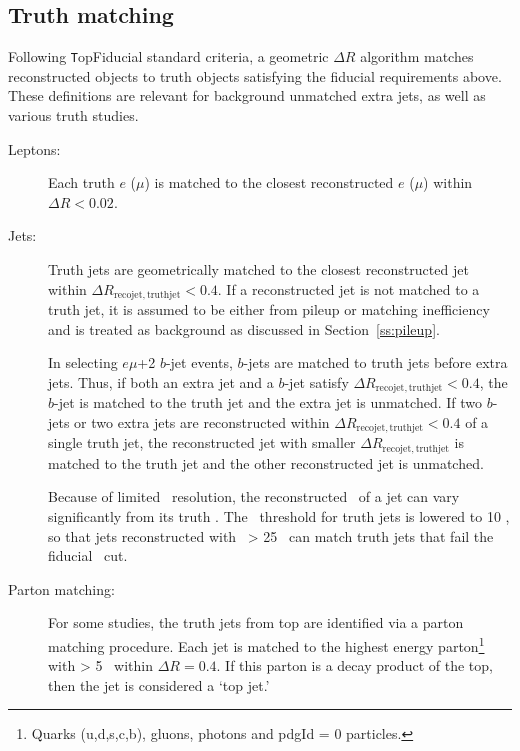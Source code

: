 \subsection{Truth matching}
\label{ss:tmatching}
Following {\texttt TopFiducial} standard criteria, a geometric $\Delta R$ algorithm matches reconstructed objects to truth objects satisfying the fiducial requirements above. These definitions are relevant for background unmatched extra jets, as well as various truth studies.
\begin{description}
\item[Leptons:] Each truth $e$ ($\mu$) is matched to the closest reconstructed $e$ ($\mu$) within $\Delta R < 0.02$.
\item[Jets:] Truth jets are geometrically matched to the closest reconstructed jet within $\Delta R_{\mathrm{reco jet, truth jet}} < 0.4$. If a reconstructed jet is not matched to a truth jet, it is assumed to be either from pileup or matching inefficiency and is treated as background as discussed in Section~\ref{ss:pileup}.

In selecting $e\mu$+2 $b$-jet events, $b$-jets are matched to truth jets before extra jets. Thus, if both an extra jet and a $b$-jet satisfy $\Delta R_{\mathrm{reco jet, truth jet}}<0.4$, the $b$-jet is matched to the truth jet and the extra jet is unmatched. If two $b$-jets or two extra jets are reconstructed within $\Delta R_{\mathrm{reco jet, truth jet}}<0.4$ of a single truth jet, the reconstructed jet with smaller $\Delta R_{\mathrm{reco jet, truth jet}}$ is matched to the truth jet and the other reconstructed jet is unmatched.

Because of limited \pt\ resolution, the reconstructed \pt\ of a jet can vary significantly from its truth \pt. The \pt\ threshold for truth jets is lowered to 10 \GeV, so that jets reconstructed with \pt\ > 25 \GeV\ can match truth jets that fail the fiducial \pt\ cut. 



\item[Parton matching:] For some studies, the truth jets from top are identified via a parton matching procedure. Each jet is matched to the highest energy parton\footnote{Quarks (u,d,s,c,b), gluons, photons and pdgId = 0 particles.} with \pt > 5 \GeV\ within $\Delta R = 0.4$. If this parton is a decay product of the top, then the jet is considered a `top jet.'
\end{description}
